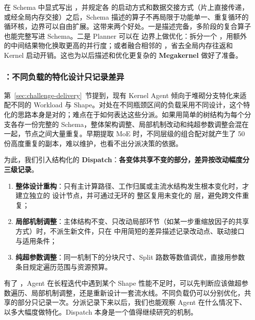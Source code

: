 在 Schema 中显式写出 ，并规定各  的启动方式和数据交接方式（片上直接传递，或经全局内存交接）之后，Schema 描述的算子不再局限于功能单一、重复循环的循环核，边界可以自由扩展。这带来两个好处。一是描述完备，多阶段的复合算子也能完整写进 Schema。二是 Planner 可以在  边界上做优化：拆分一个 ，用额外的中间结果物化换取更高的并行度；或者融合相邻的 ，省去全局内存往返和 Kernel 启动开销。这也为以后描述和优化更复杂的 \textbf{Megakernel} 做好了准备。


\subsubsection{：不同负载的特化设计只记录差异}\label{sec:dispatch}
第~\ref{sec:challenge-delivery}~节提到，现有 Kernel Agent 倾向于堆砌分支特化来适配不同的 Workload 与 Shape。对处在不同瓶颈区间的负载采用不同设计，这个特化的思路本身是对的；难点在于如何表达这些分派。如果用简单的树结构为每个分支各存一份完整的 Schema，整体架构调整、局部机制改动和纯超参数调整会混在一起，节点之间大量重复。早期提取 MoE 时，不同层级的组合配对就产生了 50 份高度重复的副本，难以维护，也看不出分派决策的依据。


为此，我们引入结构化的 \textbf{Dispatch}：\textbf{各变体共享不变的部分，差异按改动幅度分三级记录}。


\begin{enumerate}[start=1]
\item
\textbf{整体设计重构}：只有主计算路径、工作归属或主流水结构发生根本变化时，才建立独立的  设计节点，并可通过无环的  整区复用未变化的  层，避免跨文件重复；


\item
\textbf{局部机制调整}：主体结构不变、只改动局部环节（如某一步重缩放因子的共享方式）时，不派生新文件，只在  中用简短的差异描述记录改动点、联动接口与适用条件；


\item
\textbf{纯超参数调整}：同一机制下的分块尺寸、Split 路数等数值调优，直接用参数条目规定遍历范围与资源预算。


\end{enumerate}

有了 ，Agent 在长程迭代中遇到某个 Shape 性能不足时，可以先判断应该做超参数遍历、局部机制调整，还是重新设计一套流水线。不同负载仍可以分别优化，共享的部分只记录一次。分派记录下来以后，我们也能观察 Agent 在什么情况下、以多大幅度做特化。Dispatch 本身是一个值得继续研究的机制。


